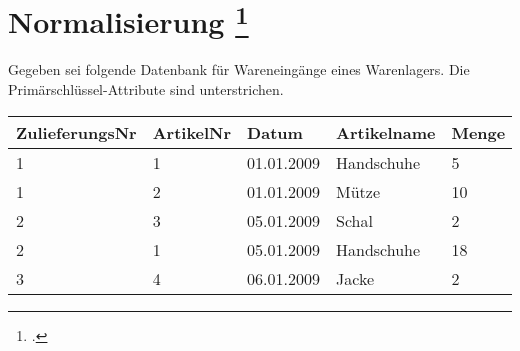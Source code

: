 \documentclass{lehramt-informatik-aufgabe}
\begin{document}
\section{Normalisierung
\footcite{examen:66116:2012:03}
}

Gegeben sei folgende Datenbank für Wareneingänge eines Warenlagers. Die
Primärschlüssel-Attribute sind unterstrichen.

\begin{center}
\begin{tabular}{|l|l|l|l|l|}
\hline
ZulieferungsNr & ArtikelNr & Datum & Artikelname & Menge\\\hline
1 & 1 & 01.01.2009 & Handschuhe & 5\\\hline
1 & 2 & 01.01.2009 & Mütze & 10\\\hline
2 & 3 & 05.01.2009 & Schal & 2\\\hline
2 & 1 & 05.01.2009 & Handschuhe & 18\\\hline
3 & 4 & 06.01.2009 & Jacke & 2\\\hline
\end{tabular}
\end{center}
\end{document}
